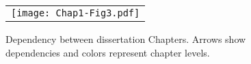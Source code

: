 \begin{figure}[h]
\begin{center}
  \begin{tabular}{c}
  \texttt{[image: Chap1-Fig3.pdf]}
  \end{tabular}
  \caption{Dependency between dissertation Chapters. Arrows show dependencies and colors represent chapter levels.}
\end{center}
\end{figure}
